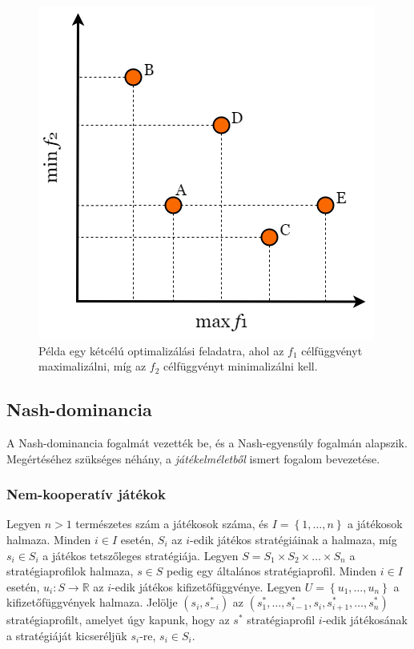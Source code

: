 \begin{figure}[t]
  \centering
  \includegraphics[scale=0.5]{images/pareto_dominance.png}
  \caption{
    Példa egy kétcélú optimalizálási feladatra, ahol az $f_1$ célfüggvényt maximalizálni, míg az $f_2$ célfüggvényt minimalizálni kell.
  }
  \label{fig:PARETO_DOMINANCE}
\end{figure}


\subsection{Nash-dominancia}\label{subsec:NASH_DOMINANCIA}
A Nash-dominancia fogalmát  vezették be, és a Nash-egyensúly fogalmán alapszik.
Megértéséhez szükséges néhány, a \emph{játékelméletből} \cite{von2007theory} ismert fogalom bevezetése.


\subsubsection{Nem-kooperatív játékok}
Legyen $n > 1$ természetes szám a játékosok száma, és $I = \left\{ 1, \dots, n \right\}$ a játékosok halmaza.
Minden $i \in I$ esetén, $S_i$ az $i$-edik játékos stratégiáinak a halmaza, míg $s_i \in S_i$ a játékos tetszőleges stratégiája.
Legyen $S = S_1 \times S_2 \times \dotsc \times S_n$ a stratégiaprofilok halmaza, $s \in S$ pedig egy általános stratégiaprofil.
Minden $i \in I$ esetén, $u_i \colon S \to \mathbb{R}$ az $i$-edik játékos kifizetőfüggvénye.
Legyen $U = \left\{ u_1, \dots, u_n \right\}$ a kifizetőfüggvények halmaza.
Jelölje $\left( s_i, s^*_{-i} \right)$ az $\left( s^*_1, \dots, s^*_{i-1}, s_i, s^*_{i+1}, \dots, s^*_n \right)$ stratégiaprofilt,
amelyet úgy kapunk, hogy az $s^*$ stratégiaprofil $i$-edik játékosának a stratégiáját kicseréljük $s_i$-re, $s_i \in S_i$.


